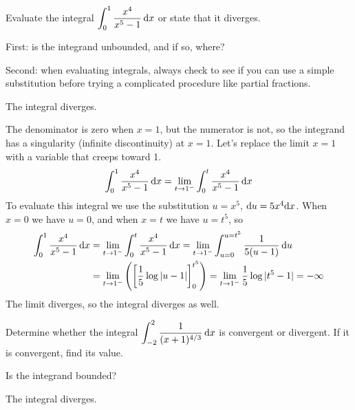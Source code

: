 \begin{Mquestion}[M105 2015A]
Evaluate the integral
$\displaystyle\int_0^1\frac{x^4}{x^5-1}\,\mathrm{d}x$ or state that
it diverges.
\end{Mquestion}

\begin{hint}
First: is the integrand unbounded, and if so, where?

Second: when evaluating integrals, always check to see if you can use a simple
substitution before trying a complicated procedure like partial fractions.
\end{hint}

\begin{answer}
The integral diverges.
\end{answer}

\begin{solution}
The denominator is zero when $x=1$, but the numerator is not, so the integrand has a
singularity (infinite discontinuity) at $x=1$. Let's replace the limit $x=1$ with a variable that creeps toward 1.
\begin{equation*}
\int_0^1\frac{x^4}{x^5-1}\,\mathrm{d}x
=\lim_{t\rightarrow 1^-}\int_0^t\frac{x^4}{x^5-1}\,\mathrm{d}x
\end{equation*}
To evaluate this integral we use the substitution
$u=x^5$, $\mathrm{d}u=5x^4\mathrm{d}x$. When $x=0$ we have $u=0$, and when $x=t$
we have $u=t^5$, so
\begin{align*}
\int_0^1\frac{x^4}{x^5-1}\,\mathrm{d}x&=\lim_{t \to 1^-}\int_{0}^{t}\frac{x^4}{x^5-1}\,\mathrm{d}x
=\lim_{t \to 1^-}\int_{u=0}^{u=t^5}\frac{1}{5(u-1)}\,\mathrm{d}u\\
&=\lim_{t \to 1^-}\left( \left[\frac{1}{5}\log|u-1|\right]_0^{t^5}\right)
=\lim_{t \to 1^-}\frac{1}{5}\log|t^5-1|=-\infty
\end{align*}
The limit diverges, so the integral diverges as well.
\end{solution}




\begin{question}[2016Q4]
Determine whether the integral
$\displaystyle\int_{-2}^2\frac{1}{(x+1)^{4/3}}\,\mathrm{d}x$ is convergent
or divergent. If it is convergent, find its value.
\end{question}

\begin{hint}
Is the integrand bounded?
\end{hint}

\begin{answer}
The integral diverges.
\end{answer}

